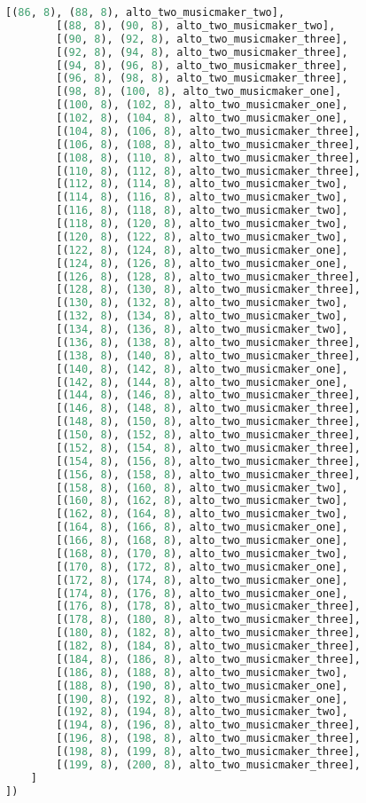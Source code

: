 \begin{lstlisting}[language=Python, caption=Invocation Source Code]
        [(86, 8), (88, 8), alto_two_musicmaker_two],
        [(88, 8), (90, 8), alto_two_musicmaker_two],
        [(90, 8), (92, 8), alto_two_musicmaker_three],
        [(92, 8), (94, 8), alto_two_musicmaker_three],
        [(94, 8), (96, 8), alto_two_musicmaker_three],
        [(96, 8), (98, 8), alto_two_musicmaker_three],
        [(98, 8), (100, 8), alto_two_musicmaker_one],
        [(100, 8), (102, 8), alto_two_musicmaker_one],
        [(102, 8), (104, 8), alto_two_musicmaker_one],
        [(104, 8), (106, 8), alto_two_musicmaker_three],
        [(106, 8), (108, 8), alto_two_musicmaker_three],
        [(108, 8), (110, 8), alto_two_musicmaker_three],
        [(110, 8), (112, 8), alto_two_musicmaker_three],
        [(112, 8), (114, 8), alto_two_musicmaker_two],
        [(114, 8), (116, 8), alto_two_musicmaker_two],
        [(116, 8), (118, 8), alto_two_musicmaker_two],
        [(118, 8), (120, 8), alto_two_musicmaker_two],
        [(120, 8), (122, 8), alto_two_musicmaker_two],
        [(122, 8), (124, 8), alto_two_musicmaker_one],
        [(124, 8), (126, 8), alto_two_musicmaker_one],
        [(126, 8), (128, 8), alto_two_musicmaker_three],
        [(128, 8), (130, 8), alto_two_musicmaker_three],
        [(130, 8), (132, 8), alto_two_musicmaker_two],
        [(132, 8), (134, 8), alto_two_musicmaker_two],
        [(134, 8), (136, 8), alto_two_musicmaker_two],
        [(136, 8), (138, 8), alto_two_musicmaker_three],
        [(138, 8), (140, 8), alto_two_musicmaker_three],
        [(140, 8), (142, 8), alto_two_musicmaker_one],
        [(142, 8), (144, 8), alto_two_musicmaker_one],
        [(144, 8), (146, 8), alto_two_musicmaker_three],
        [(146, 8), (148, 8), alto_two_musicmaker_three],
        [(148, 8), (150, 8), alto_two_musicmaker_three],
        [(150, 8), (152, 8), alto_two_musicmaker_three],
        [(152, 8), (154, 8), alto_two_musicmaker_three],
        [(154, 8), (156, 8), alto_two_musicmaker_three],
        [(156, 8), (158, 8), alto_two_musicmaker_three],
        [(158, 8), (160, 8), alto_two_musicmaker_two],
        [(160, 8), (162, 8), alto_two_musicmaker_two],
        [(162, 8), (164, 8), alto_two_musicmaker_two],
        [(164, 8), (166, 8), alto_two_musicmaker_one],
        [(166, 8), (168, 8), alto_two_musicmaker_one],
        [(168, 8), (170, 8), alto_two_musicmaker_two],
        [(170, 8), (172, 8), alto_two_musicmaker_one],
        [(172, 8), (174, 8), alto_two_musicmaker_one],
        [(174, 8), (176, 8), alto_two_musicmaker_one],
        [(176, 8), (178, 8), alto_two_musicmaker_three],
        [(178, 8), (180, 8), alto_two_musicmaker_three],
        [(180, 8), (182, 8), alto_two_musicmaker_three],
        [(182, 8), (184, 8), alto_two_musicmaker_three],
        [(184, 8), (186, 8), alto_two_musicmaker_three],
        [(186, 8), (188, 8), alto_two_musicmaker_two],
        [(188, 8), (190, 8), alto_two_musicmaker_one],
        [(190, 8), (192, 8), alto_two_musicmaker_one],
        [(192, 8), (194, 8), alto_two_musicmaker_two],
        [(194, 8), (196, 8), alto_two_musicmaker_three],
        [(196, 8), (198, 8), alto_two_musicmaker_three],
        [(198, 8), (199, 8), alto_two_musicmaker_three],
        [(199, 8), (200, 8), alto_two_musicmaker_three],
    ]
])


\end{lstlisting}
